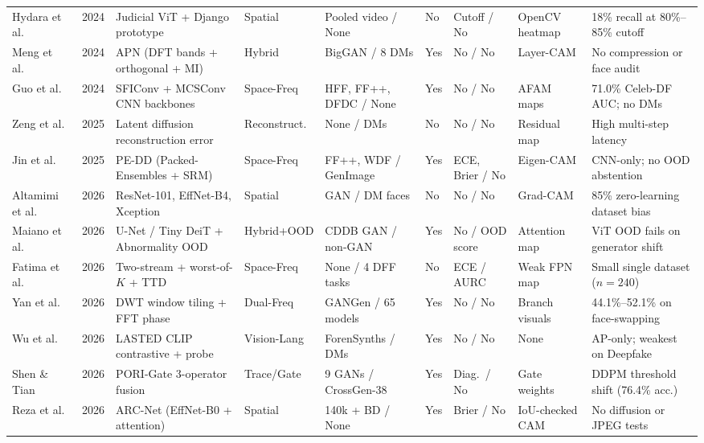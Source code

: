 \documentclass[final,5p,times,twocolumn,numafflabel]{elsarticle}
\begin{document}
\begin{table}[t]
{\begin{tabular}{@{}l r l l l l l l l@{}}
Hydara et al.\ \cite{Hydara_2024} & 2024 & Judicial ViT + Django prototype & Spatial & Pooled video / None & No & Cutoff / No & OpenCV heatmap & 18\% recall at 80\%--85\% cutoff \\
Meng et al.\ \cite{Meng_2024} & 2024 & APN (DFT bands + orthogonal + MI) & Hybrid & BigGAN / 8 DMs & Yes & No / No & Layer-CAM & No compression or face audit \\
Guo et al.\ \cite{Guo_2024} & 2024 & SFIConv + MCSConv CNN backbones & Space-Freq & HFF, FF++, DFDC / None & Yes & No / No & AFAM maps & 71.0\% Celeb-DF AUC; no DMs \\
Zeng et al.\ \cite{Zeng_2025} & 2025 & Latent diffusion reconstruction error & Reconstruct. & None / DMs & No & No / No & Residual map & High multi-step latency \\
Jin et al.\ \cite{Jin_2025} & 2025 & PE-DD (Packed-Ensembles + SRM) & Space-Freq & FF++, WDF / GenImage & Yes & ECE, Brier / No & Eigen-CAM & CNN-only; no OOD abstention \\
Altamimi et al.\ \cite{Altamimi_2026} & 2026 & ResNet-101, EffNet-B4, Xception & Spatial & GAN / DM faces & No & No / No & Grad-CAM & 85\% zero-learning dataset bias \\
Maiano et al.\ \cite{Maiano_2026} & 2026 & U-Net / Tiny DeiT + Abnormality OOD & Hybrid+OOD & CDDB GAN / non-GAN & Yes & No / OOD score & Attention map & ViT OOD fails on generator shift \\
Fatima et al.\ \cite{Fatima_2026} & 2026 & Two-stream + worst-of-$K$ + TTD & Space-Freq & None / 4 DFF tasks & No & ECE / AURC & Weak FPN map & Small single dataset ($n=240$) \\
Yan et al.\ \cite{Yan_2026} & 2026 & DWT window tiling + FFT phase & Dual-Freq & GANGen / 65 models & Yes & No / No & Branch visuals & 44.1\%--52.1\% on face-swapping \\
Wu et al.\ \cite{Wu_2026} & 2026 & LASTED CLIP contrastive + probe & Vision-Lang & ForenSynths / DMs & Yes & No / No & None & AP-only; weakest on Deepfake \\
Shen \& Tian \cite{Shen_2026} & 2026 & PORI-Gate 3-operator fusion & Trace/Gate & 9 GANs / CrossGen-38 & Yes & Diag.\ / No & Gate weights & DDPM threshold shift (76.4\% acc.) \\
Reza et al.\ \cite{Reza_2026} & 2026 & ARC-Net (EffNet-B0 + attention) & Spatial & 140k + BD / None & Yes & Brier / No & IoU-checked CAM & No diffusion or JPEG tests \\
\bottomrule
\end{tabular}%
}
\end{table}
\end{document}
